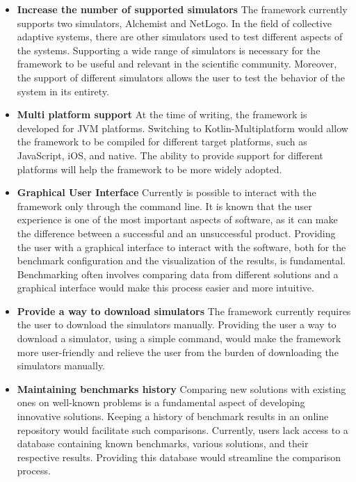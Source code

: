 \documentclass[12pt,a4paper,openright,twoside]{book}
\begin{document}
\begin{itemize}
  \item \textbf{Increase the number of supported simulators} 
  The framework currently supports two simulators, Alchemist and NetLogo.
  In the field of collective adaptive systems, there are other simulators used to test different aspects of the systems.
  Supporting a wide range of simulators is necessary for the framework to be useful and relevant in the scientific community.
  Moreover, the support of different simulators allows the user to test the behavior of the system in its entirety. 
  \item \textbf{Multi platform support}
  At the time of writing, the framework is developed for JVM platforms. 
  Switching to Kotlin-Multiplatform would allow the framework to be compiled for different target platforms, such as JavaScript, iOS, and native.
  The ability to provide support for different platforms will help the framework to be more widely adopted.
  \item \textbf{Graphical User Interface}
  Currently is possible to interact with the framework only through the command line.
  It is known that the user experience is one of the most important aspects of software, as it can make the difference between a successful and an unsuccessful product.
  Providing the user with a graphical interface to interact with the software, both for the benchmark configuration and the visualization of the results, is fundamental.
  Benchmarking often involves comparing data from different solutions and a graphical interface would make this process easier and more intuitive.
  \item \textbf{Provide a way to download simulators}
  The framework currently requires the user to download the simulators manually.
  Providing the user a way to download a simulator, using a simple command, would make the framework more user-friendly and relieve the user from the burden of downloading the simulators manually.
  \item \textbf{Maintaining benchmarks history}
  Comparing new solutions with existing ones on well-known problems is a fundamental aspect of developing innovative solutions. 
  Keeping a history of benchmark results in an online repository would facilitate such comparisons. 
  Currently, users lack access to a database containing known benchmarks, various solutions, and their respective results. 
  Providing this database would streamline the comparison process.
\end{itemize}


\backmatter




\end{document}
